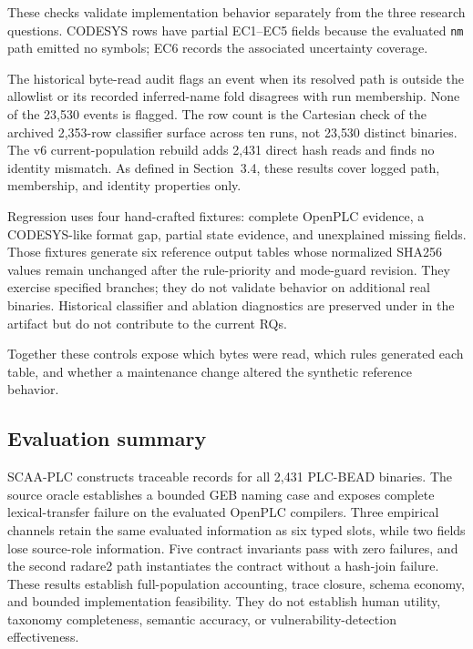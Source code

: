 \documentclass[manuscript,screen,review]{acmart}
\begin{document}
These checks validate implementation behavior separately from the three research questions. CODESYS rows have partial EC1--EC5 fields because the evaluated \texttt{nm} path emitted no symbols; EC6 records the associated uncertainty coverage.

The historical byte-read audit flags an event when its resolved path is outside the allowlist or its recorded inferred-name fold disagrees with run membership. None of the 23{,}530 events is flagged. The row count is the Cartesian check of the archived 2{,}353-row classifier surface across ten runs, not 23{,}530 distinct binaries. The v6 current-population rebuild adds 2{,}431 direct hash reads and finds no identity mismatch. As defined in Section~3.4, these results cover logged path, membership, and identity properties only.

Regression uses four hand-crafted fixtures: complete OpenPLC evidence, a CODESYS-like format gap, partial state evidence, and unexplained missing fields. Those fixtures generate six reference output tables whose normalized SHA256 values remain unchanged after the rule-priority and mode-guard revision. They exercise specified branches; they do not validate behavior on additional real binaries. Historical classifier and ablation diagnostics are preserved under  in the artifact but do not contribute to the current RQs.

Together these controls expose which bytes were read, which rules generated each table, and whether a maintenance change altered the synthetic reference behavior.

\subsection{Evaluation summary}

SCAA-PLC constructs traceable records for all 2{,}431 PLC-BEAD binaries. The source oracle establishes a bounded GEB naming case and exposes complete lexical-transfer failure on the evaluated OpenPLC compilers. Three empirical channels retain the same evaluated information as six typed slots, while two fields lose source-role information. Five contract invariants pass with zero failures, and the second radare2 path instantiates the contract without a hash-join failure. These results establish full-population accounting, trace closure, schema economy, and bounded implementation feasibility. They do not establish human utility, taxonomy completeness, semantic accuracy, or vulnerability-detection effectiveness.
\end{document}
